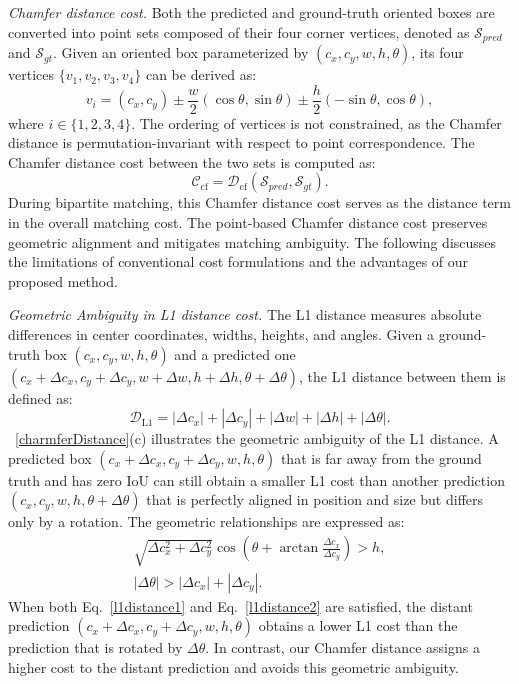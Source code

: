 \documentclass[lettersize,journal]{IEEEtran}
\begin{document}
\textit{Chamfer distance cost.}
Both the predicted and ground-truth oriented boxes are converted into point sets composed of their four corner vertices, denoted as $\mathcal{S}_{pred}$ and $\mathcal{S}_{gt}$. 
Given an oriented box parameterized by $(c_x, c_y, w, h, \theta)$, its four vertices $\{v_1,v_2,v_3,v_4\}$ can be derived as:
\begin{equation}\label{eq:rbox2vertex}
v_i = (c_x, c_y) \pm \frac{w}{2}(\cos\theta, \sin\theta) \pm \frac{h}{2}(-\sin\theta, \cos\theta),
\end{equation}
where $i\in\{1,2,3,4\}$. The ordering of vertices is not constrained, as the Chamfer distance is permutation-invariant with respect to point correspondence. The Chamfer distance cost between the two sets is computed as:
\begin{equation}
\mathcal{C}_{\text{cf}} = \mathcal{D}_{\text{cf}}(\mathcal{S}_{pred}, \mathcal{S}_{gt}).
\end{equation}
During bipartite matching, this Chamfer distance cost serves as the distance term in the overall matching cost. The point-based Chamfer distance cost preserves geometric alignment and mitigates matching ambiguity. The following discusses the limitations of conventional cost formulations and the advantages of our proposed method.


\textit{Geometric Ambiguity in L1 distance cost.}
The L1 distance measures absolute differences in center coordinates, widths, heights, and angles. Given a ground-truth box $(c_x, c_y, w, h, \theta)$ and a predicted one $(c_x+\Delta c_x,c_y+\Delta c_y, w+\Delta w, h+\Delta h, \theta+\Delta \theta)$, the L1 distance between them is defined as:
\begin{equation}
\mathcal{D}_\text{L1}=\left |\Delta c_x \right|+ \left |\Delta c_y \right|+ \left | \Delta w \right|+ \left | \Delta h \right|+ \left | \Delta \theta \right|.
\end{equation}
\figurename~\ref{charmferDistance}(c) illustrates the geometric ambiguity of the L1 distance. A predicted box $(c_x+\Delta c_x, c_y+\Delta c_y, w, h, \theta)$ that is far away from the ground truth and has zero IoU can still obtain a smaller L1 cost than another prediction $(c_x, c_y, w, h, \theta+\Delta \theta)$ that is perfectly aligned in position and size but differs only by a rotation. The geometric relationships are expressed as:
\begin{gather}
\sqrt{\Delta c_x^2+\Delta c_y^2} \cos(\theta+\arctan \frac{\Delta c_x}{\Delta c_y})>h, \label{l1distance1}\\
\left | \Delta\theta \right | >\left |  \Delta c_x\right | +\left | \Delta c_y \right |. \label{l1distance2}
\end{gather}
When both Eq.~\ref{l1distance1} and Eq.~\ref{l1distance2} are satisfied, the distant prediction $(c_x+\Delta c_x, c_y+\Delta c_y, w, h, \theta)$ obtains a lower L1 cost than the prediction that is rotated by $\Delta \theta$. In contrast, our Chamfer distance assigns a higher cost to the distant prediction and avoids this geometric ambiguity.
\end{document}
